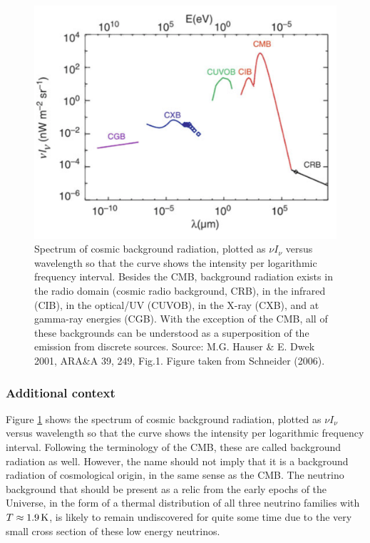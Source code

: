 \documentclass[a4paper,11pt]{article}
\begin{document}
\begin{figure}[h]
    \centering
    \includegraphics[width=14cm]{figures/DiffuseBackground.png}
    \caption{\footnotesize{Spectrum of cosmic background radiation, plotted as $\nu I_\nu$ versus wavelength so that the curve shows the intensity per logarithmic frequency interval. Besides the CMB, background radiation exists in the radio domain (cosmic radio background, CRB), in the infrared (CIB), in the optical/UV (CUVOB), in the X-ray (CXB), and at gamma-ray energies (CGB). With the exception of the CMB, all of these backgrounds can be understood as a superposition of the emission from discrete sources. Source: M.G. Hauser \& E. Dwek 2001, ARA\&A 39, 249, Fig.1. Figure taken from Schneider (2006).}}
    \label{fig:diffusebackground}
\end{figure}

\subsubsection{Additional context}

Figure \ref{fig:diffusebackground} shows the spectrum of cosmic background radiation, plotted as $\nu I_\nu$ versus wavelength so that the curve shows the intensity per logarithmic frequency interval. Following the terminology of the CMB, these are called background radiation as well. However, the name should not imply that it is a background radiation of cosmological origin, in the same sense as the CMB. The neutrino background that should be present as a relic from the early epochs of the Universe, in the form of a thermal distribution of all three neutrino families with $T\approx1.9\,{\rm K}$, is likely to remain undiscovered for quite some time due to the very small cross section of these low energy neutrinos.
\end{document}
